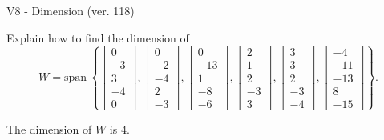 \begin{exercise}
  \begin{exerciseTitle}V8 - Dimension (ver. 118)\end{exerciseTitle}
  \begin{exerciseStatement}
    Explain how to find the dimension of 
\[W=\mathrm{span}\ \left\{\left[\begin{array}{r}
0 \\
-3 \\
3 \\
-4 \\
0
\end{array}\right] , \left[\begin{array}{r}
0 \\
-2 \\
-4 \\
2 \\
-3
\end{array}\right] , \left[\begin{array}{r}
0 \\
-13 \\
1 \\
-8 \\
-6
\end{array}\right] , \left[\begin{array}{r}
2 \\
1 \\
2 \\
-3 \\
3
\end{array}\right] , \left[\begin{array}{r}
3 \\
3 \\
2 \\
-3 \\
-4
\end{array}\right] , \left[\begin{array}{r}
-4 \\
-11 \\
-13 \\
8 \\
-15
\end{array}\right]\right\}.\]



  \end{exerciseStatement}
  \begin{exerciseAnswer}
   The dimension of \(W\) is  \(4\).
  


  \end{exerciseAnswer}
\end{exercise}